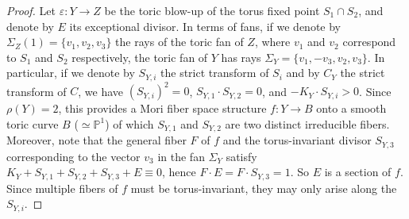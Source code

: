 \documentclass{amsart}
\newcommand{\pp}{\mathbb{P}}
\theoremstyle{definition}
\theoremstyle{remark}
\numberwithin{equation}{section}
\begin{document}
\begin{proof}
Let $\varepsilon:Y\rightarrow Z$ be the toric blow-up of the torus fixed point $S_1\cap S_2$, and denote by $E$ its exceptional divisor. In terms of fans, if we denote by $\Sigma_Z(1)=\{v_1,v_2,v_3\}$ the rays of the toric fan of $Z$, where $v_1$ and $v_2$ correspond to $S_1$ and $S_2$ respectively, the toric fan of $Y$ has rays $\Sigma_Y=\{v_1,-v_3,v_2,v_3\}$.
In particular, if we denote by $S_{Y,i}$ the strict transform of $S_i$ and
by $C_Y$ the strict transform of $C$, we have $(S_{Y,i})^2 = 0$, $S_{Y,1}\cdot S_{Y,2} = 0$, and $-K_Y\cdot S_{Y,i}>0$. Since $\rho(Y)=2$, this provides a Mori fiber space structure $f\colon Y\rightarrow B$ onto a smooth toric curve $B$ ($\simeq\pp^1$) of which $S_{Y,1}$ and $S_{Y,2}$ are two distinct irreducible fibers.
Moreover, note that the general fiber $F$ of $f$ and the torus-invariant divisor $S_{Y,3}$ corresponding to the vector $v_3$ in the fan $\Sigma_Y$ satisfy $K_Y+S_{Y,1}+S_{Y,2}+S_{Y,3}+E\equiv 0$, hence $F\cdot E = F\cdot S_{Y,3} = 1$. So $E$ is a section of $f$.
Since multiple fibers of $f$ must be torus-invariant, they may only arise along the $S_{Y,i}$.


\end{proof}
\end{document}
